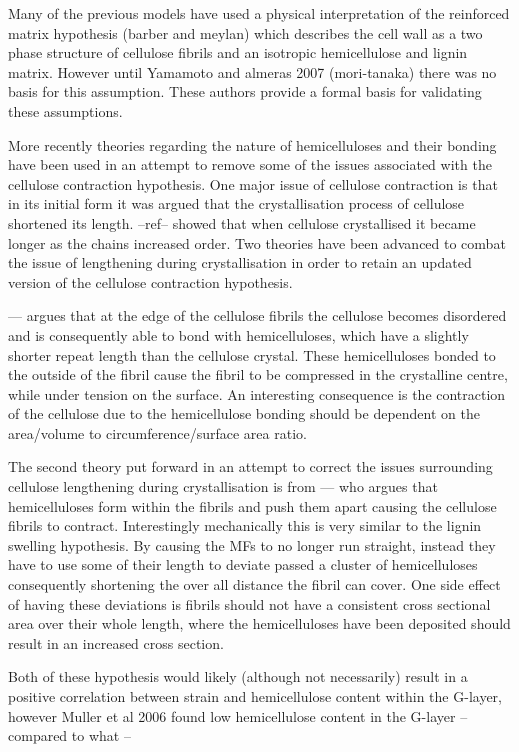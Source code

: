 \documentclass{article}
\begin{document}
Many of the previous models have used a physical interpretation of the
reinforced matrix hypothesis (barber and meylan) which describes the cell wall
as a two phase structure of cellulose fibrils and an isotropic hemicellulose and
lignin matrix. However until Yamamoto and almeras 2007 (mori-tanaka) there was
no basis for this assumption. These authors provide a formal basis for validating
these assumptions.

More recently theories regarding the nature of hemicelluloses and their bonding
have been used in an attempt to remove some of the issues associated with the
cellulose contraction hypothesis. One major issue of cellulose contraction is
that in its initial form it was argued that the crystallisation process of cellulose
shortened its length. --ref-- showed that when cellulose crystallised it became
longer as the chains increased order. Two theories have been advanced to combat
the issue of lengthening during crystallisation in order to retain an updated
version of the cellulose contraction hypothesis.

--- argues that at the edge of the cellulose fibrils the cellulose becomes
disordered and is consequently able to bond with hemicelluloses, which have a
slightly shorter repeat length than the cellulose crystal. These hemicelluloses
bonded to the outside of the fibril cause the fibril to be compressed in the
crystalline centre, while under tension on the surface. An interesting consequence
is the contraction of the cellulose due to the hemicellulose bonding should be
dependent on the area/volume to circumference/surface area ratio.

The second theory put forward in an attempt to correct the issues surrounding
cellulose lengthening during crystallisation is from --- who argues that
hemicelluloses form within the fibrils and push them apart causing the
cellulose fibrils to contract. Interestingly mechanically this is very similar
to the lignin swelling hypothesis. By causing the MFs to no longer run straight,
instead they have to use some of their length to deviate passed a cluster of
hemicelluloses consequently shortening the over all distance the fibril can
cover. One side effect of having these deviations is fibrils should not have a
consistent cross sectional area over their whole length, where the
hemicelluloses have been deposited should result in an increased cross section.

Both of these hypothesis would likely (although not necessarily) result in a
positive correlation between strain and hemicellulose content within the
G-layer, however Muller et al 2006 found low hemicellulose content in the
G-layer --compared to what --
\end{document}
